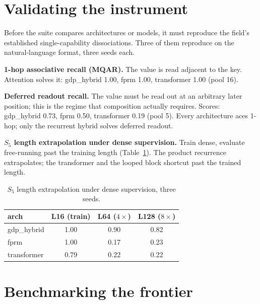 \documentclass[11pt]{article}
\newcommand{\Sfive}{$S_5$}
\begin{document}
\section{Validating the instrument}

Before the suite compares architectures or models, it must reproduce the field's established single-capability dissociations. Three of them reproduce on the natural-language format, three seeds each.

\textbf{1-hop associative recall (MQAR).} The value is read adjacent to the key. Attention
solves it: gdp\_hybrid 1.00, fprm 1.00, transformer 1.00 (pool 16).

\textbf{Deferred readout recall.} The value must be read out at an arbitrary later position; this is the regime that composition actually requires. Scores: gdp\_hybrid 0.73, fprm 0.50, transformer 0.19 (pool 5). Every architecture aces 1-hop; only the recurrent hybrid solves deferred readout.

\textbf{\Sfive{} length extrapolation under dense supervision.} Train dense, evaluate
free-running past the training length (Table~\ref{tab:s5extrap}). The product recurrence
extrapolates; the transformer and the looped block shortcut past the trained length.

\begin{table}[h]
\centering
\begin{tabular}{lccc}
\toprule
arch & L16 (train) & L64 ($4\times$) & L128 ($8\times$) \\
\midrule
gdp\_hybrid & 1.00 & 0.90 & 0.82 \\
fprm & 1.00 & 0.17 & 0.23 \\
transformer & 0.79 & 0.22 & 0.22 \\
\bottomrule
\end{tabular}
\caption{\Sfive{} length extrapolation under dense supervision, three seeds.}
\label{tab:s5extrap}
\end{table}

\section{Benchmarking the frontier}
\end{document}

